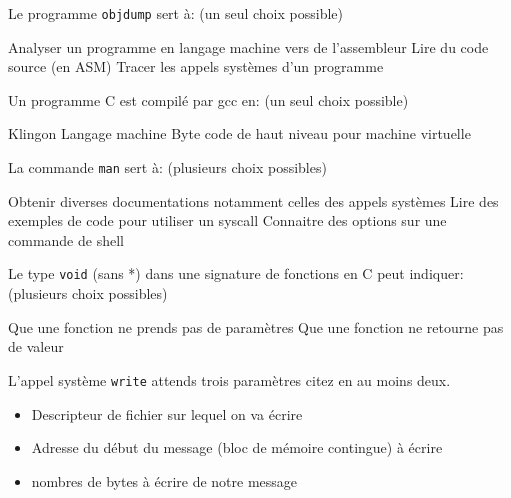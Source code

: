 \documentclass[11pt,a4paper,addpoint]{exam}
\begin{document}
\begin{questions}
    \question[3] Le programme \texttt{objdump} sert à: (un seul choix possible)
    \begin{checkboxes}
      \CorrectChoice Analyser un programme en langage machine vers de l'assembleur
      \CorrectChoice Lire du code source (en ASM)
      \CorrectChoice Tracer les appels systèmes d'un programme
    \end{checkboxes}

    \question[1] Un programme C est compilé par gcc en: (un seul choix possible)
    \begin{checkboxes}
      \choice Klingon
      \CorrectChoice Langage machine
      \choice Byte code de haut niveau pour machine virtuelle
    \end{checkboxes}

    \question[3] La commande \texttt{man} sert à: (plusieurs choix possibles)
    \begin{checkboxes}
      \CorrectChoice Obtenir diverses documentations notamment celles des appels systèmes
      \CorrectChoice Lire des exemples de code pour utiliser un syscall
      \CorrectChoice Connaitre des options sur une commande de shell
    \end{checkboxes}

    \question[2] Le type \texttt{void} (sans *) dans une signature de fonctions en C peut indiquer: (plusieurs choix possibles)
    \begin{checkboxes}
      \CorrectChoice Que une fonction ne prends pas de paramètres
      \CorrectChoice Que une fonction ne retourne pas de valeur
    \end{checkboxes}

    \question[3] L'appel système \texttt{write} attends trois paramètres citez en au moins deux.
    \ifprintanswers
    \begin{solution}
        \begin{itemize}
            \item Descripteur de fichier sur lequel on va écrire 
            \item Adresse du début du message (bloc de mémoire contingue) à écrire
            \item nombres de bytes à écrire de notre message      
        \end{itemize}
    \end{solution}  
    \else
        \vspace{64pt}
    \fi


\end{questions}
\end{document}
